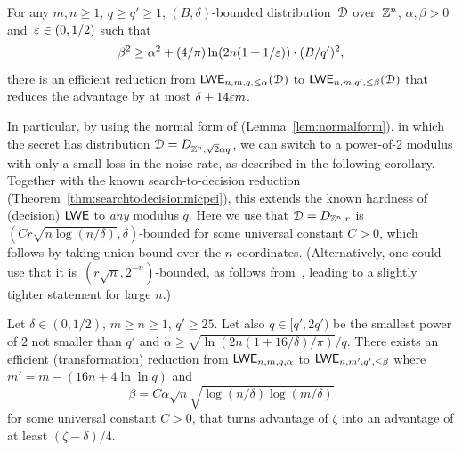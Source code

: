 \begin{corollary}
  \label{cor:mod-reduction}
  For any $m,n \geq 1$, $q \geq q' \geq 1$, $(B,\delta)$-bounded distribution~$\mathcal{D}$ over~$\mathbb{Z}^{n}$, $\alpha,\beta>0$ and~$\varepsilon \in (0,1/2)$ such that
  \[
	\beta^{2} \geq \alpha^{2} + (4/\pi) \ln(2n(1+1/\varepsilon))
  \cdot (B/q')^2,
	\]
	there is an efficient reduction from
  $\mathsf{LWE}_{n,m,q,\le \alpha}(\mathcal{D})$ to 
	$\mathsf{LWE}_{n,m,q',\le \beta}(\mathcal{D})$ that reduces the advantage by at most $\delta + 14 \varepsilon m$.
\end{corollary}

In particular, by using the normal form of \lwe (Lemma~\ref{lem:normalform}), in which the secret has distribution $\mathcal{D} = D_{\mathbb{Z}^{n}, \sqrt{2} \alpha q}$, we can switch to a power-of-2 modulus with only a small loss in the noise rate, as described in the following
corollary. Together with the known search-to-decision reduction (Theorem~\ref{thm:searchtodecisionmicpei}), this extends the known hardness
of (decision) $\mathsf{LWE}$ to \emph{any} modulus $q$.
Here we use that $\mathcal{D} = D_{\mathbb{Z}^{n}, r}$
is $(C r \sqrt{n \log(n/\delta)}, \delta)$-bounded for some universal constant $C>0$, which
follows by taking union bound over the $n$ coordinates.
(Alternatively, one could use that it is~$(r\sqrt{n},2^{-n})$-bounded, as follows
from~\cite[Lemma~1.5]{banaszczyk93:_new}, leading to a slightly tighter statement for large $n$.)

\begin{corollary}
  \label{cor:mod-reduction-2}
  Let $\delta \in (0,1/2)$, $m \ge n \geq 1$, $q' \ge 25$. Let also $q \in [q',2q')$ be the smallest power of $2$ not smaller than $q'$
	and $\alpha \ge \sqrt{\ln(2n(1+16/\delta)/\pi)}/q$.
	There exists an efficient (transformation) reduction from $\mathsf{LWE}_{n,m,q, \alpha}$ to $\mathsf{LWE}_{n,m',q', \le \beta}$
	where $m'=m-(16 n + 4 \ln\ln q)$ and 
	\[
	\beta = C \alpha \sqrt{n} \sqrt{\log(n/\delta)\log(m/\delta)}
	\]
	for some universal constant $C>0$, that turns advantage of $\zeta$ into an advantage of at least $(\zeta-\delta)/4$.
\end{corollary}


